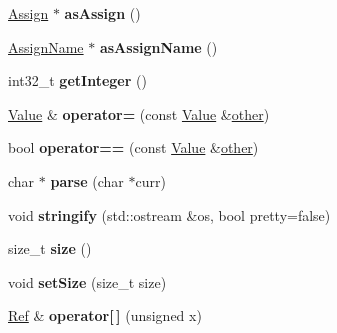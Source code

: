 \begin{DoxyCompactItemize}
\mbox{\label{structcashew_1_1_value_a8a87f6d9189f164b61dc0376b449d713}} 
\mbox{\hyperlink{structcashew_1_1_assign}{Assign}} $\ast$ {\bfseries as\+Assign} ()
\item 
\mbox{\label{structcashew_1_1_value_aa50e6b52f2bc84daddfe3c1570fc8769}} 
\mbox{\hyperlink{structcashew_1_1_assign_name}{Assign\+Name}} $\ast$ {\bfseries as\+Assign\+Name} ()
\item 
\mbox{\label{structcashew_1_1_value_a48663c17e50c7a348d684d8d5374aee5}} 
int32\+\_\+t {\bfseries get\+Integer} ()
\item 
\mbox{\label{structcashew_1_1_value_aa49dacdfafd61ceaa5633ad0b562d5b7}} 
\mbox{\hyperlink{structcashew_1_1_value}{Value}} \& {\bfseries operator=} (const \mbox{\hyperlink{structcashew_1_1_value}{Value}} \&\mbox{\hyperlink{structother}{other}})
\item 
\mbox{\label{structcashew_1_1_value_a9f91db4ec87285ae3dae440404fac90f}} 
bool {\bfseries operator==} (const \mbox{\hyperlink{structcashew_1_1_value}{Value}} \&\mbox{\hyperlink{structother}{other}})
\item 
\mbox{\label{structcashew_1_1_value_a48470cc5ba9c37940908473bb0480e31}} 
char $\ast$ {\bfseries parse} (char $\ast$curr)
\item 
\mbox{\label{structcashew_1_1_value_afdff3a656e0dd8d81452d65cc03c6676}} 
void {\bfseries stringify} (std\+::ostream \&os, bool pretty=false)
\item 
\mbox{\label{structcashew_1_1_value_ac4d696e70e5aaf9a10b7d627186070f2}} 
size\+\_\+t {\bfseries size} ()
\item 
\mbox{\label{structcashew_1_1_value_a499a7294ebaf87c4ac2fdabed8ce7d9f}} 
void {\bfseries set\+Size} (size\+\_\+t size)
\item 
\mbox{\label{structcashew_1_1_value_abcb4170e2a1bc2f54736e3ff601edf12}} 
\mbox{\hyperlink{structcashew_1_1_ref}{Ref}} \& {\bfseries operator\mbox{[}$\,$\mbox{]}} (unsigned x)

\end{DoxyCompactItemize}
